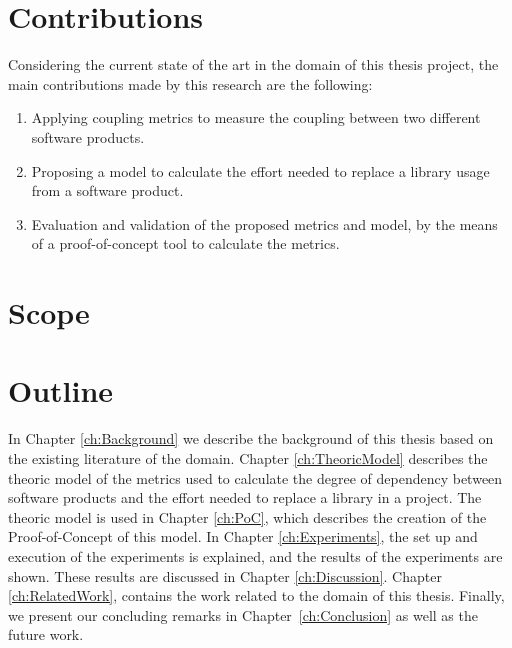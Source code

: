 \section{Contributions}
Considering the current state of the art in the domain of this thesis project, the main contributions made by this research are the following:

\begin{enumerate}
	\item Applying coupling metrics to measure the coupling between two different software products.
	\item Proposing a model to calculate the effort needed to replace a library usage from a software product.
	\item Evaluation and validation of the proposed metrics and model, by the means of a proof-of-concept tool to calculate the metrics.
\end{enumerate}

\section{Scope} %


\section{Outline}
In Chapter \ref{ch:Background} we describe the background of this thesis based on the existing literature of the domain.
Chapter \ref{ch:TheoricModel} describes the theoric model of the metrics used to calculate the degree of dependency between software products and the effort needed to replace a library in a project.
The theoric model is used in Chapter \ref{ch:PoC}, which describes the creation of the Proof-of-Concept of this model.
In Chapter \ref{ch:Experiments}, the set up and execution of the experiments is explained, and the results of the experiments are shown. These results are discussed in Chapter \ref{ch:Discussion}. Chapter \ref{ch:RelatedWork}, contains the work related to the domain of this thesis.
Finally, we present our concluding remarks in Chapter~\ref{ch:Conclusion} as well as the future work.

